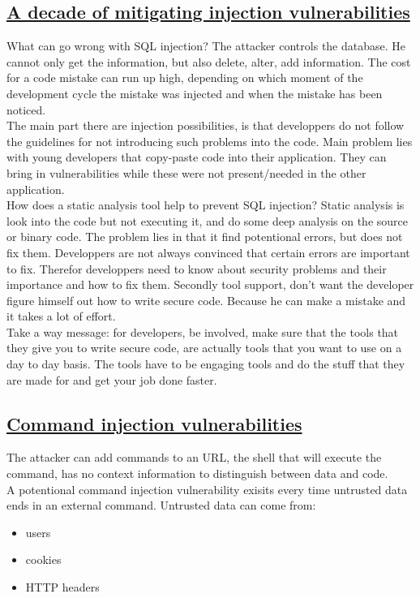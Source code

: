 \documentclass[titlepage]{article}
\begin{document}
    \subsection{\href{https://youtu.be/Wx08ILA0eMU}{A decade of mitigating injection vulnerabilities}}
    What can go wrong with SQL injection? The attacker controls the database. He cannot only get the information, but also delete, alter, add information. The cost for a code mistake can run up high, depending on which moment of the development cycle the mistake was injected and when the mistake has been noticed.\\
    The main part there are injection possibilities, is that developpers do not follow the guidelines for not introducing such problems into the code. Main problem lies with young developers that copy-paste code into their application. They can bring in vulnerabilities while these were not present/needed in the other application.\\
    How does a static analysis tool help to prevent SQL injection? Static analysis is look into the code but not executing it, and do some deep analysis on the source or binary code. The problem lies in that it find potentional errors, but does not fix them. Developpers are not always convinced that certain errors are important to fix. Therefor developpers need to know about security problems and their importance and how to fix them. Secondly tool support, don't want the developer figure himself out how to write secure code. Because he can make a mistake and it takes a lot of effort.\\
    Take a way message: for developers, be involved, make sure that the tools that they give you to write secure code, are actually tools that you want to use on a day to day basis. The tools have to be engaging tools and do the stuff that they are made for and get your job done faster.
    \subsection{\href{https://youtu.be/X9YNZ3CVtc8}{Command injection vulnerabilities}}
    The attacker can add commands to an URL, the shell that will execute the command, has no context information to distinguish between data and code.\\
    A potentional command injection vulnerability exisits every time untrusted data ends in an external command. Untrusted data can come from:
    \begin{itemize}
        \item users
        \item cookies
        \item HTTP headers
    \end{itemize}
\end{document}
